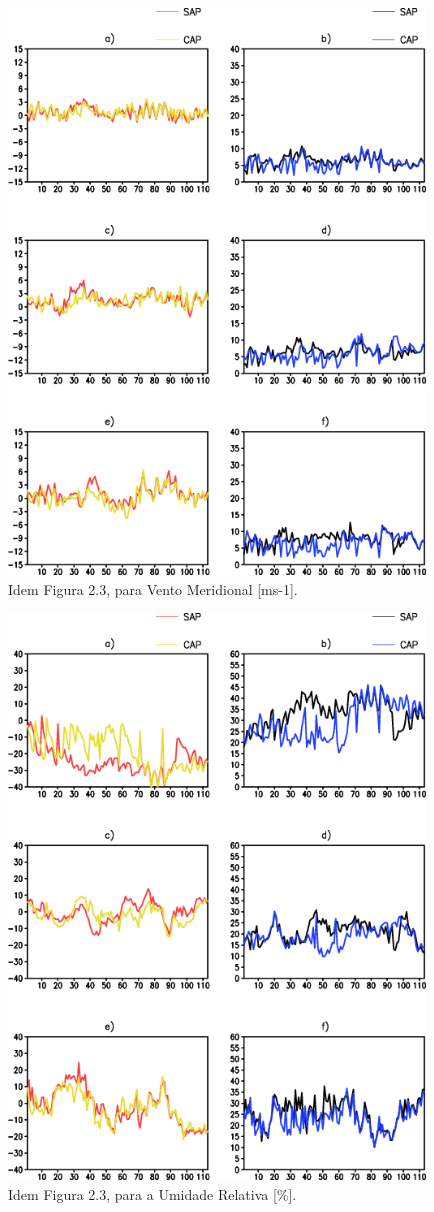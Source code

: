 \begin{figure}[!hbp]
\centering
\includegraphics[height=15cm]{./figs/vies_eqm-vvel.png}
\caption{Idem Figura 2.3, para Vento Meridional [ms-1].}
\label{fig46}
\end{figure}

\begin{figure}[!hbp]
\centering
\includegraphics[height=15cm]{./figs/vies_eqm-umrl.png}
\caption{Idem Figura 2.3, para a Umidade Relativa [\%].}
\label{fig47}
\end{figure}

